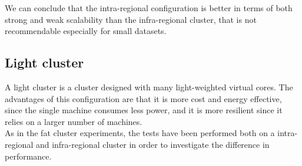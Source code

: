 \documentclass[final,5p,times,twocolumn,authoryear]{elsarticle}
\begin{document}
We can conclude that the intra-regional configuration is better in terms of both strong and weak scalability than the infra-regional cluster, that is not recommendable especially for small datasets.

\subsection{Light cluster}
A light cluster is a cluster designed with many light-weighted virtual cores. The advantages of this configuration are that it is more cost and energy effective, since the single machine consumes less power, and it is more resilient since it relies on a larger number of machines. \\
As in the fat cluster experiments, the tests have been performed both on a intra-regional and infra-regional cluster in order to investigate the difference in performance. 
\end{document}
